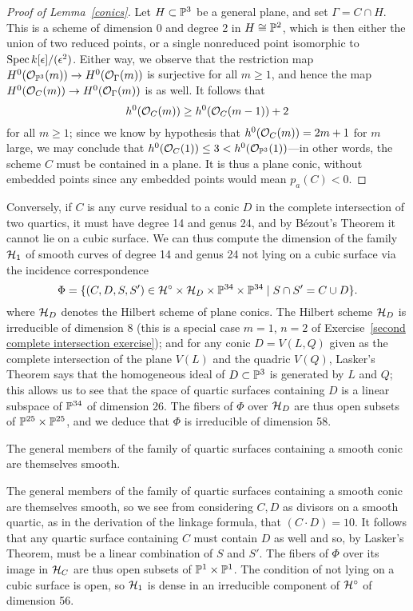 \begin{proof}[Proof of Lemma~\ref{conics}]
Let $H \subset \PP^3$ be a general plane, and set $\Gamma = C \cap H$. This is a scheme of dimension 0 and degree 2 in $H \cong \PP^2$, which is then either the union of two reduced points, or a single nonreduced point isomorphic to $\Spec k[\epsilon]/(\epsilon^2)$. Either way, we observe that the restriction map $H^0(\cO_{\PP^3}(m)) \to H^0(\cO_{\Gamma}(m))$ is surjective for all $m \geq 1$, and hence the map $H^0(\cO_{C}(m)) \to H^0(\cO_{\Gamma}(m))$ is as well. It follows that
    $$
    h^0(\cO_C(m)) \geq h^0(\cO_C(m-1)) + 2
    $$
    for all $m \geq 1$; since we know by  hypothesis that $h^0(\cO_C(m)) = 2m+1$ for $m$ large, we may conclude that $h^0(\cO_C(1)) \leq 3 < h^0(\cO_{\PP^3}(1))$---in other words, the scheme $C$ must be contained in a plane. It is thus a plane conic, without embedded points since any embedded points would mean $p_a(C) < 0$.
\end{proof}

Conversely, if $C$ is any curve residual to a conic $D$ in the complete intersection of two quartics, it must have degree 14 and genus 24, and by B\'ezout's Theorem it cannot lie on a cubic surface. We can thus compute the dimension of the family $\cH_1$ of smooth curves of degree 14 and genus 24 not lying on a cubic surface via the incidence correspondence
$$
\Phi = \{ (C, D, S, S') \in \cH^\circ \times \cH_D \times \PP^{34} \times \PP^{34} \mid S \cap S' = C \cup D\}.
$$
where $\cH_D$ denotes the Hilbert scheme of plane conics. The Hilbert scheme $\cH_D$ is irreducible of dimension 8 (this is a special case $m=1$, $n=2$ of Exercise~\ref{second complete intersection exercise}); and for any conic $D = V(L,Q)$ given as the complete intersection of the plane $V(L)$ and the quadric $V(Q)$, Lasker's Theorem says that the homogeneous ideal of $D \subset \PP^3$ is generated by $L$ and $Q$; this allows us to see that  the space of quartic surfaces containing $D$ is a linear subspace of $\PP^{34}$ of dimension 26. The fibers of $\Phi$ over $\cH_D$ are thus open subsets of $\PP^{25} \times \PP^{25}$, and we deduce that $\Phi$ is irreducible of dimension 58. 

\begin{exercise}
The general members of the family of quartic surfaces containing a smooth conic are themselves smooth. 
\end{exercise}

The general members of the family of quartic surfaces containing a smooth conic are themselves smooth, so we see from considering $C,D$ as divisors on a smooth quartic, as in the derivation of the linkage formula, that $(C\cdot D) = 10$. It follows that any quartic surface containing $C$ must contain $D$ as well and so, by Lasker's Theorem, must be a linear combination of $S$ and $S'$.   The fibers of $\Phi$ over its image in $\cH_C$ are thus open subsets of $\PP^1 \times \PP^1$. 
The condition of not lying on a cubic surface is open, so $\cH_1$  is dense in an irreducible component of $\cH^\circ$ of dimension 56.

